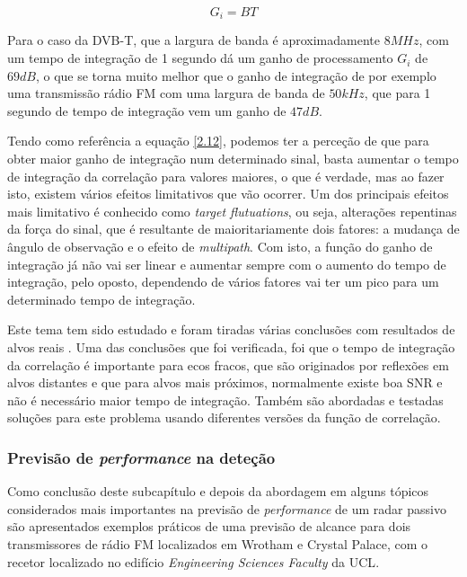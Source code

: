 \begin{equation} \label{2.12}
G_{i}=BT
\end{equation}

Para o caso da \gls{DVB-T}, que a largura de banda é aproximadamente $8 MHz$, com um tempo de integração de 1 segundo dá um ganho de processamento $G_{i}$ de $69dB$, o que se torna muito melhor que o ganho de integração de por exemplo uma transmissão rádio \gls{FM} com uma largura de banda de $50 kHz$, que para 1 segundo de tempo de integração vem um ganho de $47dB$.\par 
Tendo como referência a equação \ref{2.12}, podemos ter a perceção de que para obter maior ganho de integração num determinado sinal, basta aumentar o tempo de integração da correlação para valores maiores, o que é verdade, mas ao fazer isto, existem vários efeitos limitativos que vão ocorrer. Um dos principais efeitos mais limitativo é conhecido como \textit{target flutuations}, ou seja, alterações repentinas da força do sinal, que é resultante de maioritariamente dois fatores: a mudança de ângulo de observação e o efeito de \textit{multipath}. Com isto, a função do ganho de integração já não vai ser linear e aumentar sempre com o aumento do tempo de integração, pelo oposto, dependendo de vários fatores vai ter um pico para um determinado tempo de integração.\par 
Este tema tem sido estudado e foram tiradas várias conclusões com resultados de alvos reais \parencite{Malanowski2008}. Uma das conclusões que foi verificada, foi que o tempo de integração da correlação é importante para ecos fracos, que são originados por reflexões em alvos distantes e que para alvos mais próximos, normalmente existe boa \gls{SNR} e não é necessário maior tempo de integração. Também são abordadas e testadas soluções para este problema usando diferentes versões da função de correlação.

\subsubsection*{Previsão de \textit{performance} na deteção}
Como conclusão deste subcapítulo e depois da abordagem em alguns tópicos considerados mais importantes na previsão de \textit{performance} de um radar passivo são apresentados exemplos práticos \parencite{Griffiths2005} de uma previsão de alcance para dois transmissores de rádio \gls{FM} localizados em Wrotham e Crystal Palace, com o recetor localizado no edifício \textit{Engineering Sciences Faculty} da \gls{UCL}.

